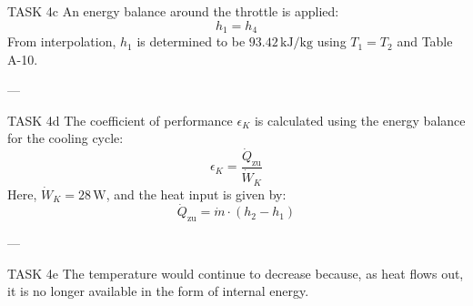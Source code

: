 TASK 4c  
An energy balance around the throttle is applied:  
\[
h_1 = h_4
\]  
From interpolation, \( h_1 \) is determined to be \( 93.42 \, \text{kJ/kg} \) using \( T_1 = T_2 \) and Table A-10.

---

TASK 4d  
The coefficient of performance \( \epsilon_K \) is calculated using the energy balance for the cooling cycle:  
\[
\epsilon_K = \frac{\dot{Q}_{\text{zu}}}{\dot{W}_K}
\]  
Here, \( \dot{W}_K = 28 \, \text{W} \), and the heat input is given by:  
\[
\dot{Q}_{\text{zu}} = \dot{m} \cdot (h_2 - h_1)
\]

---

TASK 4e  
The temperature would continue to decrease because, as heat flows out, it is no longer available in the form of internal energy.